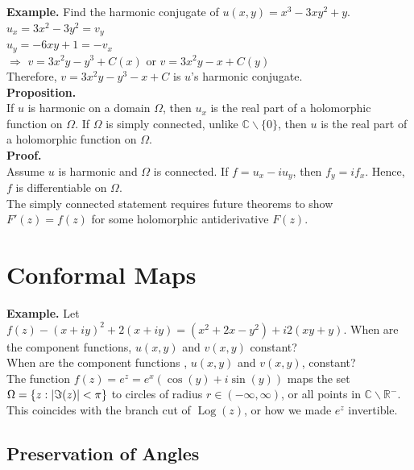 \documentclass[11pt]{article}
\DeclarePairedDelimiter\abs{\lvert}{\rvert}
\begin{document}
\textbf{Example.} Find the harmonic conjugate of $u(x, y) = x^3 - 3xy^2 + y$. \\
$u_x = 3x^2 - 3y^2 = v_y$ \\
$u_y = -6xy + 1 = -v_x$ \\
$\Rightarrow$ $v = 3x^2y - y^3 + C(x)$ or $v = 3x^2y - x + C(y)$ \\
Therefore, $v = 3x^2y - y^3 - x + C$ is $u$'s harmonic conjugate. \\
\newline 
\textbf{Proposition.} \\ 
If $u$ is harmonic on a domain $\Omega$, then $u_x$ is the real part of a holomorphic function on $\Omega$. If $\Omega$ is simply connected, unlike $\mathbb{C} \backslash \{0\}$, then $u$ is the real part of a holomorphic function on $\Omega$. \\
\textbf{Proof.} \\
Assume $u$ is harmonic and $\Omega$ is connected. If $f = u_x - iu_y$, then $f_y = if_x$. Hence, $f$ is differentiable on $\Omega$. \\
The simply connected statement requires future theorems to show $F'(z) = f(z)$ for some holomorphic antiderivative $F(z)$. 

\newpage
\section{Conformal Maps}
\textbf{Example.} Let $f(z) - (x + iy)^2 + 2(x +iy) = (x^2 + 2x - y^2) + i2(xy + y)$. When are the component functions, $u(x, y)$ and $v(x, y)$ constant? \\
When are the component functions , $u(x, y)$ and $v(x, y)$, constant? \\
The function $f(z) = e^z = e^x(\cos(y) + i\sin(y))$ maps the set $\Omega = \{z: \abs{\Im(z)} < \pi \}$ to circles of radius $r \in (-\infty, \infty)$, or all points in $\mathbb{C} \backslash \mathbb{R}^-$. This coincides with the branch cut of $\operatorname{Log}(z)$, or how we made $e^z$ invertible. \\

\subsection{Preservation of Angles}
\end{document}
